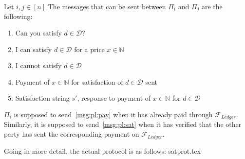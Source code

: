   Let $i, j \in \left[n\right]$ The messages that can be sent between $\Pi_i$ and $\Pi_j$
  are the following:
  \begin{enumerate}
    \item Can you satisfy $d \in \mathcal{D}$?
    \item I can satisfy $d \in \mathcal{D}$ for a price $x \in \mathbb{N}$
    \item I cannot satisfy $d \in \mathcal{D}$
    \item \label{msg:pl:pay} Payment of $x \in \mathbb{N}$ for satisfaction of $d \in \mathcal{D}$ sent
    \item \label{msg:pl:sat} Satisfaction string $s'$, response to payment of $x \in \mathbb{N}$ for $d \in
    \mathcal{D}$
  \end{enumerate}
  $\Pi_i$ is supposed to send~\ref{msg:pl:pay} when it has already paid through
  $\mathcal{F}_{Ledger}$. Similarly, it is supposed to send~\ref{msg:pl:sat} when it has
  verified that the other party has sent the corresponding payment on
  $\mathcal{F}_{Ledger}$.

  Going in more detail, the actual protocol is as follows:
  {satprot.tex}
